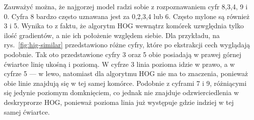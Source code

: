 \documentclass[10pt]{article}
\begin{document}
Zauważyć można, że najgorzej model radzi sobie z rozpoznawaniem cyfr 8,3,4, 9 i 0.
Cyfra 8 bardzo często uznawana jest za 0,2,3,4 lub 6.
Często mylone są również 3 i 5.
Wynika to z faktu, że algorytm HOG wewnątrz komórek uzwględnia tylko ilość gradientów, a nie ich położenie względem siebie.
Dla przykładu, na rys.~\ref{fig:hig-similar} przedstawiono różne cyfry, które po ekstrakcji cech wyglądają podobnie.
Tak oto przedstawione cyfry 3 oraz 5 obie posiadają w prawej górnej ćwiartce linię ukośną i poziomą.
W cyfrze 3 linia pozioma idzie w prawo, a w cyfrze 5 --- w lewo, natomiast dla algorytmu HOG nie ma to znaczenia, ponieważ obie linie znajdują się w tej samej komórce.
Podobnie z cyframi 7 i 9, różniącymi się jedynie poziomym domknięciem, co jednak nie znajduje odzwierciedlenia w deskryprorze HOG, ponieważ pozioma linia już występuje gdzie indziej w tej samej ćwiartce.
\end{document}
